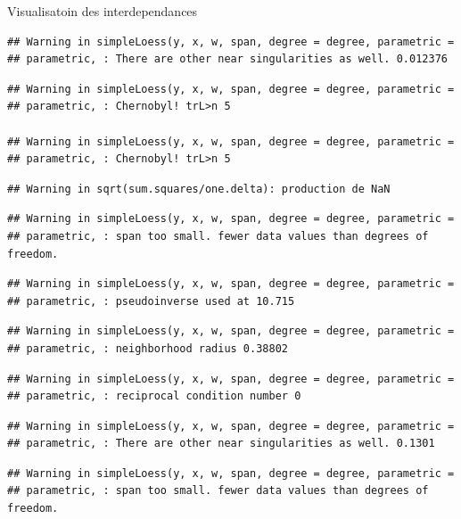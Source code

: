 \documentclass[11pt,ignorenonframetext,]{beamer}
\begin{document}
\begin{frame}[fragile]{Visualisatoin des interdependances}
\begin{verbatim}
## Warning in simpleLoess(y, x, w, span, degree = degree, parametric =
## parametric, : There are other near singularities as well. 0.012376
\end{verbatim}

\begin{verbatim}
## Warning in simpleLoess(y, x, w, span, degree = degree, parametric =
## parametric, : Chernobyl! trL>n 5

## Warning in simpleLoess(y, x, w, span, degree = degree, parametric =
## parametric, : Chernobyl! trL>n 5
\end{verbatim}

\begin{verbatim}
## Warning in sqrt(sum.squares/one.delta): production de NaN
\end{verbatim}

\begin{verbatim}
## Warning in simpleLoess(y, x, w, span, degree = degree, parametric =
## parametric, : span too small. fewer data values than degrees of freedom.
\end{verbatim}

\begin{verbatim}
## Warning in simpleLoess(y, x, w, span, degree = degree, parametric =
## parametric, : pseudoinverse used at 10.715
\end{verbatim}

\begin{verbatim}
## Warning in simpleLoess(y, x, w, span, degree = degree, parametric =
## parametric, : neighborhood radius 0.38802
\end{verbatim}

\begin{verbatim}
## Warning in simpleLoess(y, x, w, span, degree = degree, parametric =
## parametric, : reciprocal condition number 0
\end{verbatim}

\begin{verbatim}
## Warning in simpleLoess(y, x, w, span, degree = degree, parametric =
## parametric, : There are other near singularities as well. 0.1301
\end{verbatim}

\begin{verbatim}
## Warning in simpleLoess(y, x, w, span, degree = degree, parametric =
## parametric, : span too small. fewer data values than degrees of freedom.
\end{verbatim}


\end{frame}
\end{document}
